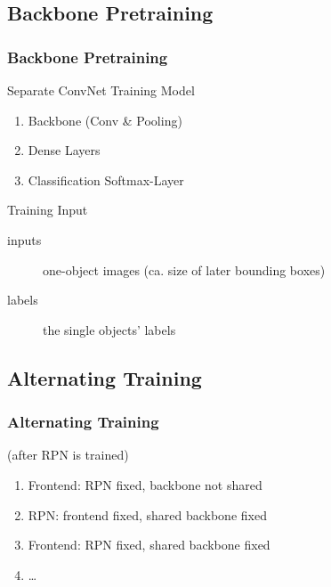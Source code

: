 \subsection{Backbone Pretraining}\label{backbonetraining}
\begin{frame}[<+->][t]
  \frametitle<presentation>{Backbone Pretraining}
  \begin{block}{Separate ConvNet Training Model}
    \begin{enumerate}
    \item Backbone (Conv \& Pooling)
    \item Dense Layers
    \item Classification Softmax-Layer
    \end{enumerate}
  \end{block}

  \begin{block}{Training Input}
    \begin{description}
    \item[inputs] one-object images
      (ca. size of later bounding boxes)
    \item[labels] the single objects' labels
    \end{description}
  \end{block}
\end{frame}

\subsection{Alternating Training}
\begin{frame}[<+->]
  \frametitle<presentation>{Alternating Training}
  (after RPN is trained)
  \begin{enumerate}
  \item Frontend: RPN fixed, backbone not shared
  \item RPN: frontend fixed, shared backbone fixed
  \item Frontend: RPN fixed, shared backbone fixed
  \item \dots {}
  \end{enumerate}
\end{frame}

